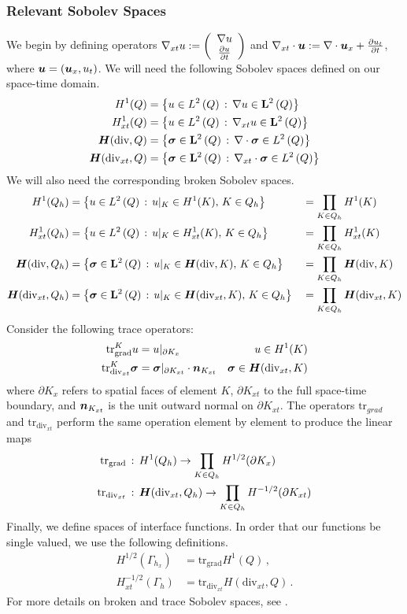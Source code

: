\documentclass{article}
\theoremstyle{definition}
\theoremstyle{remark}
\begin{document}
\subsubsection{Relevant Sobolev Spaces}
We begin by defining operators $\nabla_{xt} u:=\left( \begin{array}{c} \nabla u\\ \frac{\partial u}{\partial t}\\ \end{array} \right)$ and $\nabla_{xt}\cdot\boldsymbol u:=\nabla\cdot\boldsymbol u_x+\frac{\partial u_t}{\partial t}$, where $\boldsymbol u=(\boldsymbol u_x,u_t)$.
We will need the following Sobolev spaces defined on our space-time domain.
\begin{align*}
H^{1}(Q)&=\left\{ u\in L^2\left( Q \right)\,:\,\nabla u\in\mathbf{L}^2\left( Q \right) \right\}\\
H^1_{xt}(Q)&=\left\{ u\in L^2\left( Q \right)\,:\,\nabla_{xt} u\in\mathbf{L}^2\left( Q \right) \right\}\\
\mbox{\boldmath $H$}(\text{div},Q)&=\left\{ \boldsymbol\sigma\in\mathbf{L}^2\left( Q \right)\,:\,\nabla\cdot\boldsymbol\sigma\in L^2\left( Q \right) \right\}\\
\mbox{\boldmath $H$}(\text{div}_{xt},Q)&=\left\{ \boldsymbol\sigma\in\mathbf{L}^2\left( Q \right)\,:\,\nabla_{xt}\cdot\boldsymbol\sigma\in L^2\left( Q \right) \right\}\\
\end{align*}
We will also need the corresponding broken Sobolev spaces.
\begin{align*}
H^1(Q_h)&=\left\{ u\in L^2\left( Q \right)\,:\,u|_K\in H^{1}(K),\,K\in Q_h \right\}&&=\prod_{K\in Q_h}H^1(K)\\
H^1_{xt}(Q_h)&=\left\{ u\in L^2\left( Q \right)\,:\,u|_K\in H^1_{xt}(K),\,K\in Q_h \right\}&&=\prod_{K\in Q_h}H^1_{xt}(K)\\
\mbox{\boldmath $H$}(\text{div},Q_h)&=\left\{ \boldsymbol\sigma\in\mathbf{L}^2\left( Q \right)\,:\,u|_K\in\mbox{\boldmath $H$}(\text{div},K),\,K\in Q_h \right\}&&=\prod_{K\in Q_h}\mbox{\boldmath $H$}(\text{div},K)\\
\mbox{\boldmath $H$}(\text{div}_{xt},Q_h)&=\left\{ \boldsymbol\sigma\in\mathbf{L}^2\left( Q \right)\,:\,u|_K\in\mbox{\boldmath $H$}(\text{div}_{xt},K),\,K\in Q_h \right\}&&=\prod_{K\in Q_h}\mbox{\boldmath $H$}(\text{div}_{xt},K)
\end{align*}
Consider the following trace operators:
\begin{align*}
\text{tr}^K_\text{grad} u&=u|_{\partial K_x} & u\in H^1(K)\\
\text{tr}^K_{\text{div}_{xt}} \boldsymbol\sigma&=\boldsymbol\sigma|_{\partial K_{xt}}\cdot\boldsymbol n_{K_{xt}} & \boldsymbol\sigma\in \mbox{\boldmath $H$}(\text{div}_{xt},K)
\end{align*}
where $\partial K_x$ refers to spatial faces of element $K$, $\partial K_{xt}$ to the full space-time boundary, and $\boldsymbol n_{K_{xt}}$ is the unit outward normal on $\partial K_{xt}$.
The operators $\text{tr}_{grad}$ and $\text{tr}_{\text{div}_{xt}}$ perform the same operation element by element to produce the linear maps
\begin{align*}
\text{tr}_{\text{grad}}&\,:\,H^1(Q_h)\rightarrow\prod_{K\in Q_h}H^{1/2}(\partial K_x)\\
\text{tr}_{\text{div}_{xt}}&\,:\,\mbox{\boldmath $H$}(\text{div}_{xt},Q_h)\rightarrow\prod_{K\in Q_h}H^{-1/2}(\partial K_{xt})
\end{align*}
Finally, we define spaces of interface functions.
In order that our functions be single valued, we use the following definitions.
\begin{align*}
H^{1/2}(\Gamma_{h_x})&=\text{tr}_{\text{grad}}H^{1}(Q)\,,\\
H^{-1/2}_{xt}(\Gamma_h)&=\text{tr}_{\text{div}_{xt}}H(\text{div}_{xt},Q)\,.
\end{align*}
For more details on broken and trace Sobolev spaces, see \cite{BreakingSpaces}.
\end{document}
